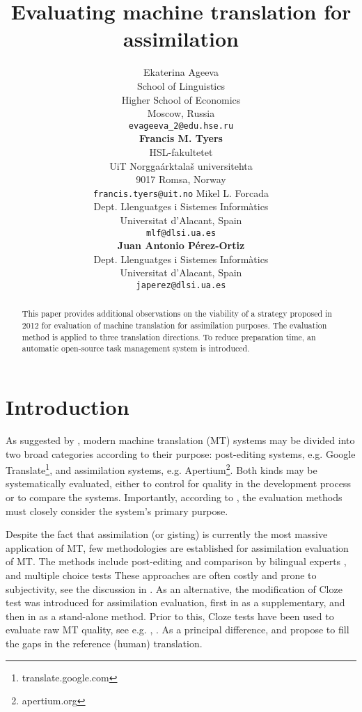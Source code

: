 \documentclass[11pt]{article}
\title{Evaluating machine translation for assimilation}
\author{Ekaterina Ageeva\\
  School of Linguistics\\
  Higher School of Economics\\
  Moscow, Russia\\
  {\tt evageeva\_2@edu.hse.ru}\\[2ex]
  \textbf{Francis M. Tyers}\\
  HSL-fakultetet\\ 
  UiT Norgga\'{a}rktala\v{s} universitehta \\
  9017 Romsa, Norway \\
  {\tt francis.tyers@uit.no}
  \And
  Mikel L. Forcada\\
  Dept. Llenguatges i Sistemes Inform\`{a}tics\\
  Universitat d'Alacant, Spain \\
  {\tt mlf@dlsi.ua.es}  \\[2ex]
  \textbf{Juan Antonio P\'{e}rez-Ortiz} \\
  Dept. Llenguatges i Sistemes Inform\`{a}tics\\
  Universitat d'Alacant, Spain \\
  {\tt japerez@dlsi.ua.es}
}
\date{}
\newcommand{\comment}[1]{\marginpar{\scriptsize\sf \textcolor{blue}{#1}}}
\begin{document}
\maketitle
\begin{abstract}
This paper provides additional observations on the viability of a strategy proposed in 2012 for evaluation of machine translation for assimilation purposes. The evaluation method is applied to three translation directions. To reduce preparation time, an automatic open-source task management system is introduced.
\comment{FMT: Abstract should mirror/summarise the article, e.g. include something about conclusions too}
\end{abstract}

\section{Introduction}

As suggested by \citet{church93}, modern machine translation (MT) systems may
be divided into two broad categories according to their purpose: post-editing systems, e.g.
Google Translate\footnote{translate.google.com}, and assimilation systems, e.g. Apertium\footnote{apertium.org}. Both kinds may be systematically evaluated, either to control for quality in the development process or to compare the systems. Importantly, according to \citet{church93}, the evaluation methods must closely consider the system's primary purpose.
\comment{FMT: Apertium can also be used for postedition, e.g. spanish-catalan, and some Google translate directions aren't suitable for that. Perhaps reword or remove this}

\comment{EA: I'd like a citation for the ``most massive application'', could you suggest something?}
Despite the fact that assimilation (or gisting) is currently the most massive application of MT, few methodologies are established for assimilation evaluation of MT. The methods include post-editing and comparison by bilingual experts \citep{ginesti09}, and multiple choice tests \citep{jones07,trosterud12} These approaches are often costly and prone to subjectivity, see the discussion in \cite{oregan13}. As an alternative, the modification of Cloze test was introduced for assimilation evaluation, first in \citep{trosterud12} as a supplementary, and then in \citep{oregan13} as a stand-alone method. Prior to this, Cloze tests have been used to evaluate raw MT quality, see e.g. \citep{vanslype79}, \citep{somers00}. As a principal difference, \citet{trosterud12} and \citet{oregan13} propose to fill the gaps in the reference (human) translation.
\end{document}
